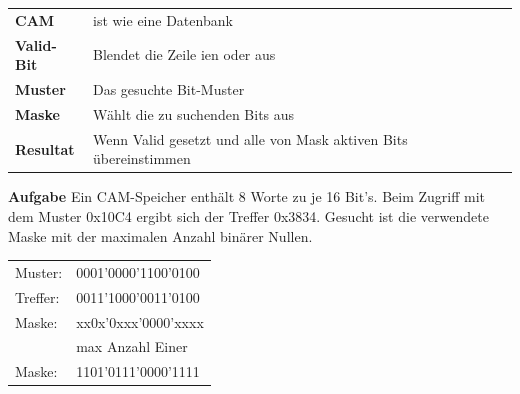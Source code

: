 \renewcommand{\arraystretch}{0.5}
\begin{tabular}{ll}
   \textbf{CAM}         & ist wie eine Datenbank\\
   \textbf{Valid-Bit}   & Blendet die Zeile ien oder aus\\
   \textbf{Muster}      & Das gesuchte Bit-Muster\\
   \textbf{Maske}       & Wählt die zu suchenden Bits aus\\
   \textbf{Resultat}    & Wenn Valid gesetzt und alle von Mask aktiven Bits übereinstimmen\\
\end{tabular}\newline
\textbf{Aufgabe}\newline
Ein CAM-Speicher enthält 8 Worte zu je 16 Bit's. Beim Zugriff mit dem Muster 0x10C4 ergibt sich der Treffer 0x3834.\newline
Gesucht ist die verwendete Maske mit der maximalen Anzahl binärer Nullen.\newline
\begin{tabular}{ll}
    Muster: & 0001'0000'1100'0100\\
    Treffer:& 0011'1000'0011'0100\\
    \hline
    Maske:  & xx0x'0xxx'0000'xxxx\\
    &max Anzahl Einer\\
    Maske:  & 1101'0111'0000'1111\\  
\end{tabular}
\renewcommand{\arraystretch}{1}
\newline



